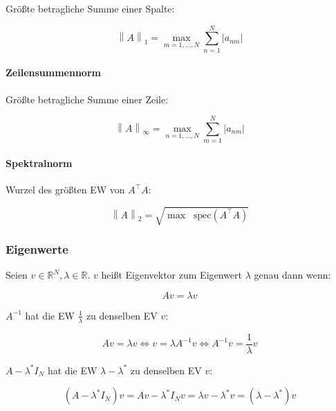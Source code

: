 \documentclass[a4paper, 14pt]{article}
\newcommand{\norm}[1]{\left\lVert#1\right\rVert}
\newcommand*\Spektrum{\mathop{}\!\mathrm{spec}}
\begin{document}
	Größte betragliche Summe einer Spalte:

	\begin{equation}
		\norm{A}_1 = \max_{m = 1, ..., N}{\sum_{n = 1}^N{|a_{nm}|}}
	\end{equation}

	\paragraph{Zeilensummennorm}

	Größte betragliche Summe einer Zeile:

	\begin{equation}
		\norm{A}_\infty = \max_{n = 1, ..., N}{\sum_{m = 1}^N{|a_{nm}|}}
	\end{equation}

	\paragraph{Spektralnorm}

	Wurzel des größten EW von $A^\top A$:

	\begin{equation}
		\norm{A}_2 = \sqrt{\max \Spektrum(A^\top A)}
	\end{equation}

	\subsubsection{Eigenwerte}

	Seien $v \in \mathbb{R}^N, \lambda \in \mathbb{R}$. $v$ heißt Eigenvektor zum Eigenwert $\lambda$ genau dann wenn:

	\begin{equation}
		A v = \lambda v
	\end{equation}

	$A^{-1}$ hat die EW $\frac{1}{\lambda}$ zu denselben EV $v$:

	\begin{equation}
		A v = \lambda v \Leftrightarrow v = \lambda A^{-1} v \Leftrightarrow A^{-1} v = \frac{1}{\lambda} v
	\end{equation}

	$A - \lambda^* I_N$ hat die EW $\lambda - \lambda^*$ zu denselben EV $v$:

	\begin{equation}
		(A - \lambda^* I_N) v = A v - \lambda^* I_N v = \lambda v - \lambda^* v = (\lambda - \lambda^*)v
	\end{equation}
\end{document}
